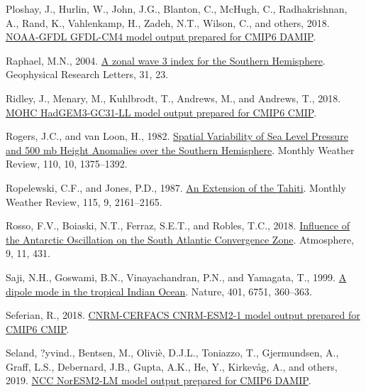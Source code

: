 \documentclass[12pt,oneside]{reedthesis}
\newlength{\cslhangindent}
\newenvironment{CSLReferences}[2] %
 {%
  \setlength{\parindent}{0pt}
  \ifodd #1 \everypar{\setlength{\hangindent}{\cslhangindent}}\ignorespaces\fi
  \ifnum #2 > 0
  \setlength{\parskip}{#2\baselineskip}
  \fi
 }%
 {}
\begin{document}
\begin{CSLReferences}{1}{0}
\leavevmode{}%
Ploshay, J., Hurlin, W., John, J.G., Blanton, C., McHugh, C., Radhakrishnan, A., Rand, K., Vahlenkamp, H., Zadeh, N.T., Wilson, C., and others, 2018. \href{https://doi.org/10.22033/ESGF/CMIP6.11383}{NOAA-GFDL GFDL-CM4 model output prepared for CMIP6 DAMIP}.

\leavevmode{}%
Raphael, M.N., 2004. \href{https://doi.org/10.1029/2004GL020365}{A zonal wave 3 index for the {Southern Hemisphere}}. Geophysical Research Letters, 31, 23.

\leavevmode{}%
Ridley, J., Menary, M., Kuhlbrodt, T., Andrews, M., and Andrews, T., 2018. \href{https://doi.org/10.22033/ESGF/CMIP6.419}{MOHC HadGEM3-GC31-LL model output prepared for CMIP6 CMIP}.

\leavevmode{}%
Rogers, J.C., and van Loon, H., 1982. \href{https://doi.org/10.1175/1520-0493(1982)110\%3C1375:SVOSLP\%3E2.0.CO;2}{Spatial {Variability} of {Sea Level Pressure} and 500 mb {Height Anomalies} over the {Southern Hemisphere}}. Monthly Weather Review, 110, 10, 1375--1392.

\leavevmode{}%
Ropelewski, C.F., and Jones, P.D., 1987. \href{https://doi.org/10.1175/1520-0493(1987)115\%3C2161:AEOTTS\%3E2.0.CO;2}{An {Extension} of the {Tahiti}}. Monthly Weather Review, 115, 9, 2161--2165.

\leavevmode{}%
Rosso, F.V., Boiaski, N.T., Ferraz, S.E.T., and Robles, T.C., 2018. \href{https://doi.org/10.3390/atmos9110431}{Influence of the {Antarctic Oscillation} on the {South Atlantic Convergence Zone}}. Atmosphere, 9, 11, 431.

\leavevmode{}%
Saji, N.H., Goswami, B.N., Vinayachandran, P.N., and Yamagata, T., 1999. \href{https://doi.org/10.1038/43854}{A dipole mode in the tropical {Indian Ocean}}. Nature, 401, 6751, 360--363.

\leavevmode{}%
Seferian, R., 2018. \href{https://doi.org/10.22033/ESGF/CMIP6.1391}{CNRM-CERFACS CNRM-ESM2-1 model output prepared for CMIP6 CMIP}.

\leavevmode{}%
Seland, ?yvind., Bentsen, M., Oliviè, D.J.L., Toniazzo, T., Gjermundsen, A., Graff, L.S., Debernard, J.B., Gupta, A.K., He, Y., Kirkevåg, A., and others, 2019. \href{https://doi.org/10.22033/ESGF/CMIP6.580}{NCC NorESM2-LM model output prepared for CMIP6 DAMIP}.


\end{CSLReferences}
\end{document}

